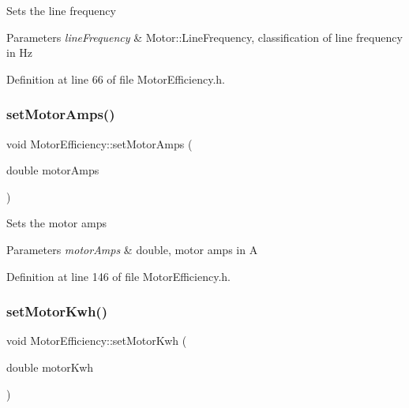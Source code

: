Sets the line frequency 
\begin{DoxyParams}{Parameters}
{\em line\+Frequency} & Motor\+::\+Line\+Frequency, classification of line frequency in Hz \\
\hline
\end{DoxyParams}


Definition at line 66 of file Motor\+Efficiency.\+h.

\mbox{\label{class_motor_efficiency_ac86aa8d6162e63eb440e07e557534c74}} 
\subsubsection{\texorpdfstring{set\+Motor\+Amps()}{setMotorAmps()}}
{\footnotesize\ttfamily void Motor\+Efficiency\+::set\+Motor\+Amps (\begin{DoxyParamCaption}\item[{double}]{motor\+Amps }\end{DoxyParamCaption})\hspace{0.3cm}{\ttfamily [inline]}}

Sets the motor amps 
\begin{DoxyParams}{Parameters}
{\em motor\+Amps} & double, motor amps in A \\
\hline
\end{DoxyParams}


Definition at line 146 of file Motor\+Efficiency.\+h.

\mbox{\label{class_motor_efficiency_ab1c7507bac259565e43a6777d079148b}} 
\subsubsection{\texorpdfstring{set\+Motor\+Kwh()}{setMotorKwh()}}
{\footnotesize\ttfamily void Motor\+Efficiency\+::set\+Motor\+Kwh (\begin{DoxyParamCaption}\item[{double}]{motor\+Kwh }\end{DoxyParamCaption})\hspace{0.3cm}{\ttfamily [inline]}}


